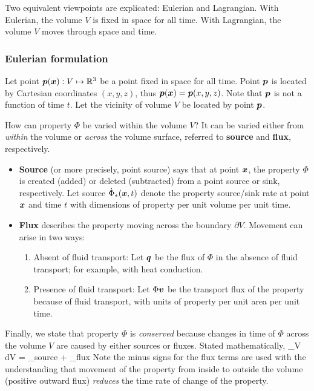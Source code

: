 \documentclass[10pt,reqno]{amsart}
\begin{document}
Two equivalent viewpoints are explicated: Eulerian and Lagrangian.  
With Eulerian, the volume $V$ is fixed in space for all time.  
With Lagrangian, the volume $V$ moves through space and time.  

\subsubsection{Eulerian formulation}
Let point $\mbox{\boldmath $p$}(\mbox{\boldmath $x$}) : V \mapsto \mathbb{R}^3$ 
be a point fixed in space for all time.  Point $\mbox{\boldmath $p$}$ is 
located by Cartesian coordinates $(x,y,z)$, thus $\mbox{\boldmath $p$}(\mbox{\boldmath $x$}) = \mbox{\boldmath $p$}(x,y,z)$.  
Note that $\mbox{\boldmath $p$}$ is not a function of time $t$.
Let the vicinity of volume $V$ be located by point $\mbox{\boldmath $p$}$.

How can property $\Phi$ be varied within the volume $V$?  It can be varied
either from {\em within} the volume or {\em across} the volume surface, 
referred to {\bf source} and {\bf flux}, respectively.
\begin{itemize}
 \item {\bf Source} (or more precisely, point source) says that at point $\mbox{\boldmath $x$}$, 
 the property $\Phi$ is created 
 (added) or deleted (subtracted) from a point source or sink, respectively.  
 Let source $\dot{\Phi}_*(\mbox{\boldmath $x$},t)$ denote the property source/sink rate 
 at point $\mbox{\boldmath $x$}$ and time $t$ with dimensions of 
 property per unit volume per unit time.  
 \item {\bf Flux} describes the property moving across the boundary 
 $\partial V$.  Movement can arise in two ways:
 \begin{enumerate}
  \item Absent of fluid transport:  Let $\mbox{\boldmath $q$}$ be the flux of $\Phi$ in the 
  absence of fluid transport; for example, with heat conduction.  
  \item Presence of fluid transport: Let $\Phi \mbox{\boldmath $v$}$ 
  be the transport flux of the property 
  because of fluid transport, with units of property
  per unit area per unit time.
 \end{enumerate}
\end{itemize}
Finally, we state that property $\Phi$ is {\it conserved} because changes in 
time of $\Phi$ across the volume $V$ are caused by either sources 
or fluxes.    
Stated mathematically, 
\be
  \int_V \Phi \; dV = 
 _{\mbox{\small source}} 
 \hspace{0.25cm} + \hspace{0.25cm} _{\mbox{\small flux}}
 \label{eq:conservation}
\ee
Note the minus signs for the flux terms are used with the understanding that 
movement of the property from inside to outside the volume 
(positive outward flux) {\em reduces} the time rate of change of the property.  
\end{document}
